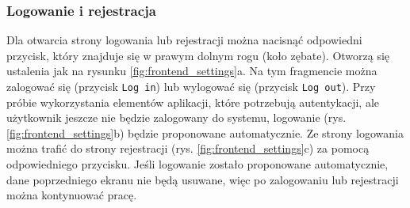 \subsubsection{Logowanie i rejestracja}
Dla otwarcia strony logowania lub rejestracji można nacisnąć odpowiedni przycisk, który znajduje się w prawym dolnym rogu (koło zębate). Otworzą się ustalenia jak na rysunku \ref{fig:frontend_settings}a. Na tym fragmencie można zalogować się (przycisk \texttt{Log in}) lub wylogować się (przycisk \texttt{Log out}).
Przy próbie wykorzystania elementów aplikacji, które potrzebują autentykacji, ale użytkownik jeszcze nie będzie zalogowany do systemu, logowanie (rys. \ref{fig:frontend_settings}b) będzie proponowane automatycznie. Ze strony logowania można trafić do strony rejestracji (rys. \ref{fig:frontend_settings}c) za pomocą odpowiedniego przycisku.
Jeśli logowanie zostało proponowane automatycznie, dane poprzedniego ekranu nie będą usuwane, więc po zalogowaniu lub rejestracji można kontynuować pracę.

